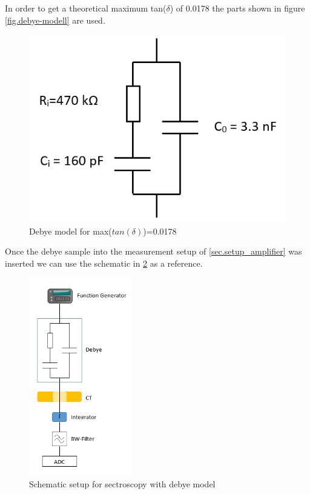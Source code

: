 In order to get a theoretical maximum tan($\delta$) of 0.0178 the parts shown in figure \ref{fig.debye-modell} are used. 
\begin{figure}[h!tb]
	\centerline{\includegraphics[scale=0.7]{figures/Method/debye-modell.jpg}}	
	\caption{Debye model for max($tan(\delta)$)=0.0178 }	
	\label{fig.debye-modellsch}
\end{figure}

Once the debye sample into the measurement setup of \ref{sec.setup_amplifier} was inserted we can use the schematic in \ref{fig.presentation} as a reference.

\begin{figure}[h!tb]
	\centerline{\includegraphics[width=0.4\textwidth]{figures/Method/setup/low_voltage_setup.png}}	
	\caption{Schematic setup for sectroscopy with debye model}	
	\label{fig.presentation}
\end{figure}

